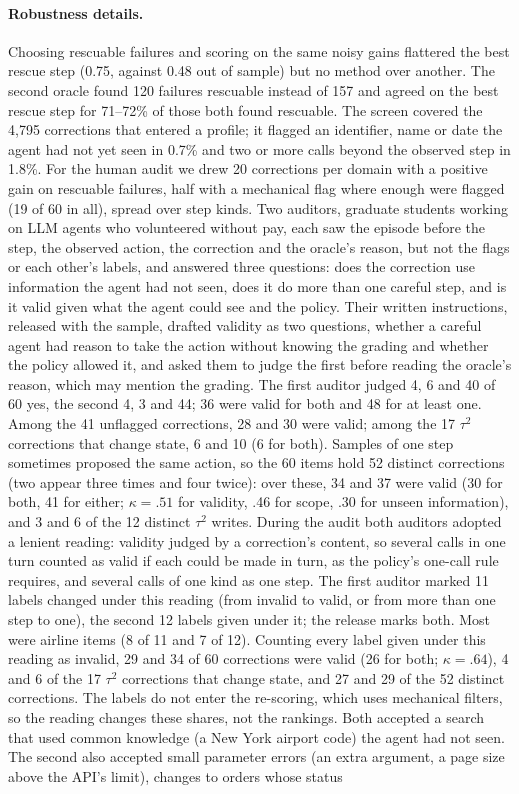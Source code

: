\documentclass[11pt]{article}
\begin{document}
\paragraph{Robustness details.}
\label{app:robust}
Choosing rescuable failures and scoring on the same noisy gains flattered the best rescue step (0.75, against 0.48 out of sample) but no method over another. The second oracle found 120 failures rescuable instead of 157 and agreed on the best rescue step for 71--72\% of those both found rescuable. The screen covered the 4{,}795 corrections that entered a profile; it flagged an identifier, name or date the agent had not yet seen in 0.7\% and two or more calls beyond the observed step in 1.8\%. For the human audit we drew 20 corrections per domain with a positive gain on rescuable failures, half with a mechanical flag where enough were flagged (19 of 60 in all), spread over step kinds. Two auditors, graduate students working on LLM agents who volunteered without pay, each saw the episode before the step, the observed action, the correction and the oracle's reason, but not the flags or each other's labels, and answered three questions: does the correction use information the agent had not seen, does it do more than one careful step, and is it valid given what the agent could see and the policy. Their written instructions, released with the sample, drafted validity as two questions, whether a careful agent had reason to take the action without knowing the grading and whether the policy allowed it, and asked them to judge the first before reading the oracle's reason, which may mention the grading. The first auditor judged 4, 6 and 40 of 60 yes, the second 4, 3 and 44; 36 were valid for both and 48 for at least one. Among the 41 unflagged corrections, 28 and 30 were valid; among the 17 $\tau^2$ corrections that change state, 6 and 10 (6 for both). Samples of one step sometimes proposed the same action, so the 60 items hold 52 distinct corrections (two appear three times and four twice): over these, 34 and 37 were valid (30 for both, 41 for either; $\kappa=.51$ for validity, .46 for scope, .30 for unseen information), and 3 and 6 of the 12 distinct $\tau^2$ writes. During the audit both auditors adopted a lenient reading: validity judged by a correction's content, so several calls in one turn counted as valid if each could be made in turn, as the policy's one-call rule requires, and several calls of one kind as one step. The first auditor marked 11 labels changed under this reading (from invalid to valid, or from more than one step to one), the second 12 labels given under it; the release marks both. Most were airline items (8 of 11 and 7 of 12). Counting every label given under this reading as invalid, 29 and 34 of 60 corrections were valid (26 for both; $\kappa=.64$), 4 and 6 of the 17 $\tau^2$ corrections that change state, and 27 and 29 of the 52 distinct corrections. The labels do not enter the re-scoring, which uses mechanical filters, so the reading changes these shares, not the rankings. Both accepted a search that used common knowledge (a New York airport code) the agent had not seen. The second also accepted small parameter errors (an extra argument, a page size above the API's limit), changes to orders whose status 
\end{document}
